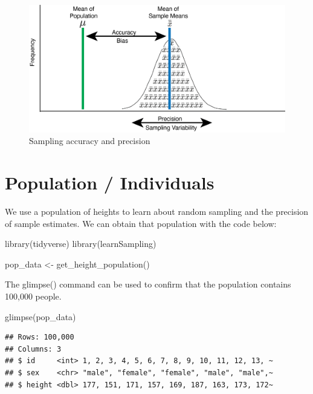 \documentclass[
]{krantz}
\makeatletter
\newenvironment{Shaded}{\begin{snugshade}}{\end{snugshade}}
\newcommand{\FunctionTok}[1]{\textcolor[rgb]{0,0,0}{#1}}
\newcommand{\NormalTok}[1]{#1}
\newcommand{\OtherTok}[1]{\textcolor[rgb]{0.37,0.37,0.37}{#1}}
\newenvironment{kframe}{%
\medskip{}
\setlength{\fboxsep}{.8em}
 \def\at@end@of@kframe{}%
 \ifinner\ifhmode%
  \def\at@end@of@kframe{\end{minipage}}%
  \begin{minipage}{\columnwidth}%
 \fi\fi%
 \def\FrameCommand##1{\hskip\@totalleftmargin \hskip-\fboxsep
 \colorbox{shadecolor}{##1}\hskip-\fboxsep
     \hskip-\linewidth \hskip-\@totalleftmargin \hskip\columnwidth}%
 \MakeFramed {\advance\hsize-\width
   \@totalleftmargin\z@ \linewidth\hsize
   \@setminipage}}%
 {\par\unskip\endMakeFramed%
 \at@end@of@kframe}
\renewenvironment{Shaded}{\begin{kframe}}{\end{kframe}}
\makeatother
\begin{document}
\begin{figure}
\includegraphics[width=0.8\linewidth]{ch_samples_precision/images/sampling_accuracy} \caption{Sampling accuracy and precision}\label{fig:showbias2}
\end{figure}

\hypertarget{population-individuals}{%
\section{Population / Individuals}\label{population-individuals}}

We use a population of heights to learn about random sampling and the precision of sample estimates. We can obtain that population with the code below:

\begin{Shaded}
\begin{Highlighting}[]
\FunctionTok{library}\NormalTok{(tidyverse)}
\FunctionTok{library}\NormalTok{(learnSampling)}

\NormalTok{pop\_data }\OtherTok{\textless{}{-}} \FunctionTok{get\_height\_population}\NormalTok{() }
\end{Highlighting}
\end{Shaded}

The glimpse() command can be used to confirm that the population contains 100,000 people.

\begin{Shaded}
\begin{Highlighting}[]
\FunctionTok{glimpse}\NormalTok{(pop\_data)}
\end{Highlighting}
\end{Shaded}

\begin{verbatim}
## Rows: 100,000
## Columns: 3
## $ id     <int> 1, 2, 3, 4, 5, 6, 7, 8, 9, 10, 11, 12, 13, ~
## $ sex    <chr> "male", "female", "female", "male", "male",~
## $ height <dbl> 177, 151, 171, 157, 169, 187, 163, 173, 172~
\end{verbatim}
\end{document}
